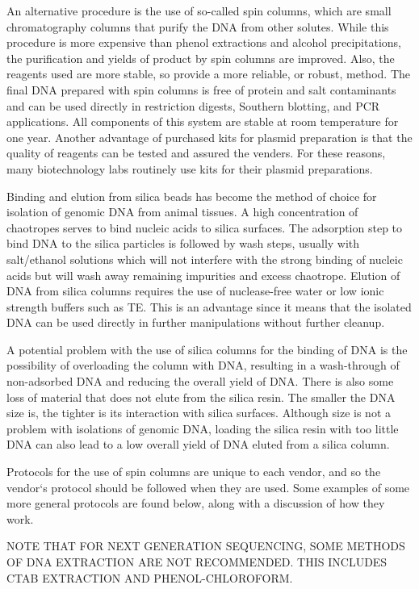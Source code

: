 \documentclass[11pt, oneside]{article}
\begin{document}
		An alternative procedure is the use of so-called spin columns, which are small chromatography columns that purify the DNA from other solutes. 		While this procedure is more expensive than phenol extractions and alcohol precipitations, the purification and yields of product by spin columns 		are improved. Also, the reagents used are more stable, so provide a more reliable, or robust, method. The final DNA prepared with spin columns 		is free of protein and salt contaminants and can be used directly in restriction digests, Southern blotting, and PCR applications. All components 		of this system are stable at room temperature for one year. Another advantage of purchased kits for plasmid preparation is that the quality of 			reagents can be tested and assured the venders. For these reasons, many biotechnology labs routinely use kits for their plasmid preparations.

		Binding and elution from silica beads has become the method of choice for isolation of genomic DNA from animal tissues. A high concentration of 		chaotropes serves to bind nucleic acids to silica surfaces. The adsorption step to bind DNA to the silica particles is followed by wash steps, 			usually with salt/ethanol solutions which will not interfere with the strong binding of nucleic acids but will wash away remaining impurities and 			excess chaotrope. Elution of DNA from silica columns requires the use of nuclease-free water or low ionic strength buffers such as TE. This is an 		advantage since it means that the isolated DNA can be used directly in further manipulations without further cleanup.

		A potential problem with the use of silica columns for the binding of DNA is the possibility of overloading the column with DNA, resulting in a 			wash-through of non-adsorbed DNA and reducing the overall yield of DNA. There is also some loss of material that does not elute from the silica 		resin. The smaller the DNA size is, the tighter is its interaction with silica surfaces. Although size is not a problem with isolations of genomic DNA, 		loading the silica resin with too little DNA can also lead to a low overall yield of DNA eluted from a silica column.

		Protocols for the use of spin columns are unique to each vendor, and so the vendor`s protocol should be followed when they are used. Some 			examples of some more general protocols are found below, along with a discussion of how they work.
		
		NOTE THAT FOR NEXT GENERATION SEQUENCING, SOME METHODS OF DNA EXTRACTION ARE NOT RECOMMENDED.  THIS INCLUDES CTAB EXTRACTION AND PHENOL-CHLOROFORM.
\end{document}
